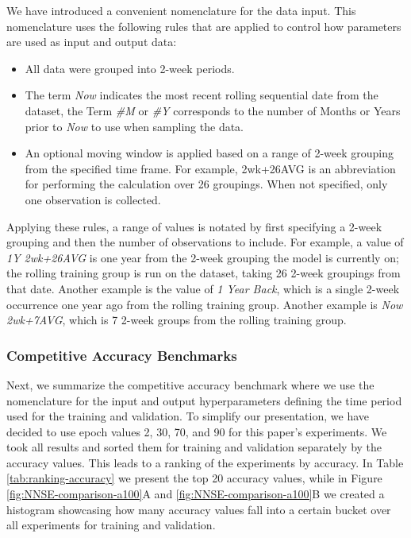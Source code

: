 \documentclass[utf8]{FrontiersinVancouver} %
\begin{document}
We have introduced a convenient nomenclature for the data input. This nomenclature uses the following rules that are applied to control how parameters are used as input and output data:

\begin{itemize}
  \item All data were grouped into 2-week periods.
  \item The term {\em Now} indicates the most recent rolling sequential date from the dataset, the Term {\em \#M} or {\em \#Y}    corresponds to the number of Months or Years prior to {\em Now} to use when sampling the data.
  \item An optional moving window is applied based on a range of    2-week grouping from the specified time frame.  For example,    2wk+26AVG is an abbreviation for performing the calculation over    26 groupings.  When not specified, only one observation is collected.
\end{itemize}



Applying these rules, a range of values is notated by first specifying a 2-week grouping and then the number of observations to include. For example, a value of {\em 1Y 2wk+26AVG} is one year from the 2-week grouping the model is currently on; the rolling training group is run on the dataset, taking 26 2-week groupings from that date. Another example is the value of {\em 1 Year Back}, which is a single 2-week occurrence one year ago from the rolling training group. Another example is {\em Now 2wk+7AVG}, which is 7 2-week groups from the rolling training group.


\subsubsection{Competitive Accuracy Benchmarks}

Next, we summarize the competitive accuracy benchmark where we use the nomenclature for the input and output hyperparameters defining the time period used for the training and validation.  To simplify our presentation, we have decided to use epoch values 2, 30, 70, and 90 for this paper's experiments. We took all results and sorted them for training and validation separately by the accuracy values. This leads to a ranking of the experiments by accuracy. In Table \ref{tab:ranking-accuracy} we present the top 20 accuracy values, while in Figure \ref{fig:NNSE-comparison-a100}A and \ref{fig:NNSE-comparison-a100}B we created a histogram showcasing how many accuracy values fall into a certain bucket over all experiments for training and validation.
\end{document}
